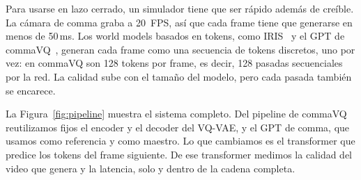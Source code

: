 \documentclass[10pt,twocolumn,a4paper]{article}
\DeclareRobustCommand{\editado}[1]{\textcolor{editado}{#1}}
\DeclareRobustCommand{\editado}[1]{#1}
\newcommand{\ms}{\,ms}
\begin{document}
Para usarse en lazo cerrado, un simulador tiene que ser rápido además de creíble. La cámara de comma graba a 20~FPS, así que cada frame tiene que generarse en menos de 50\ms. Los world models basados en tokens, como IRIS~\cite{micheli2023iris} y el GPT de commaVQ~\cite{commavq}, generan cada frame como una secuencia de tokens discretos, uno por vez: en commaVQ son 128 tokens por frame, es decir, 128 pasadas secuenciales por la red. La calidad sube con el tamaño del modelo, pero cada pasada también se encarece.

\editado{La Figura~\ref{fig:pipeline} muestra el sistema completo. Del pipeline de commaVQ reutilizamos fijos el encoder y el decoder del VQ-VAE, y el GPT de comma, que usamos como referencia y como maestro. Lo que cambiamos es el transformer que predice los tokens del frame siguiente. De ese transformer medimos la calidad del video que genera y la latencia, solo y dentro de la cadena completa.}
\end{document}
